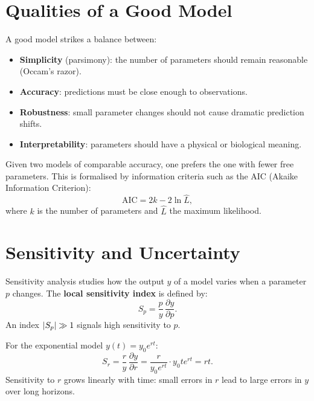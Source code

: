 \section{Qualities of a Good Model}

\begin{bestpractice}[title=\textbf{Quality criteria}]
A good model strikes a balance between:
\begin{itemize}
  \item \textbf{Simplicity} (parsimony): the number of parameters should
    remain reasonable (Occam's razor).
  \item \textbf{Accuracy}: predictions must be close enough to
    observations.
  \item \textbf{Robustness}: small parameter changes should not cause
    dramatic prediction shifts.
  \item \textbf{Interpretability}: parameters should have a physical
    or biological meaning.
\end{itemize}
\end{bestpractice}

\begin{proposition}
Given two models of comparable accuracy, one prefers the one with
fewer free parameters.  This is formalised by information criteria
such as the AIC (Akaike Information Criterion):
\[
  \mathrm{AIC} = 2k - 2\ln \hat{L},
\]
where $k$ is the number of parameters and $\hat{L}$ the maximum
likelihood.
\end{proposition}

\section{Sensitivity and Uncertainty}
\label{sec:sensitivity}

\begin{definition}
Sensitivity analysis studies how the output $y$ of a model varies
when a parameter $p$ changes.  The \textbf{local sensitivity index}
is defined by:
\[
  S_p = \frac{p}{y}\,\frac{\partial y}{\partial p}.
\]
An index $\left| S_p \right|\gg 1$ signals high sensitivity to $p$.
\end{definition}

\begin{example}
For the exponential model $y(t)=y_0 e^{rt}$:
\[
  S_r = \frac{r}{y}\,\frac{\partial y}{\partial r}
      = \frac{r}{y_0 e^{rt}}\cdot y_0 t e^{rt} = rt.
\]
Sensitivity to $r$ grows linearly with time: small errors in $r$
lead to large errors in $y$ over long horizons.
\end{example}


